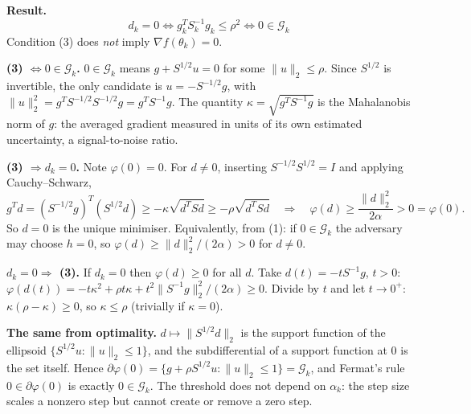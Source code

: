 \documentclass[11pt,a4paper]{article}
\newcommand{\G}{\mathcal{G}_k}
\newcommand{\norm}[1]{\lVert #1\rVert_2}
\begin{document}
\textbf{Result.}
\begin{equation*}
\boxed{\;d_k=0\iff g_k^TS_k^{-1}g_k\le\rho^2\iff0\in\G\;}
\end{equation*}
Condition (3) does \emph{not} imply $\nabla f(\theta_k)=0$.

\textbf{(3) $\iff0\in\G$.} $0\in\G$ means $g+S^{1/2}u=0$ for some $\norm u\le\rho$. Since
$S^{1/2}$ is invertible, the only candidate is $u=-S^{-1/2}g$, with
$\norm u^2=g^TS^{-1/2}S^{-1/2}g=g^TS^{-1}g$. The quantity $\kappa=\sqrt{g^TS^{-1}g}$ is
the Mahalanobis norm of $g$: the averaged gradient measured in units of its own estimated
uncertainty, a signal-to-noise ratio.

\textbf{(3) $\Rightarrow d_k=0$.} Note $\varphi(0)=0$. For $d\ne0$, inserting
$S^{-1/2}S^{1/2}=I$ and applying Cauchy--Schwarz,
\begin{equation*}
g^Td=(S^{-1/2}g)^T(S^{1/2}d)\ge-\kappa\sqrt{d^TSd}\ge-\rho\sqrt{d^TSd}
\quad\Longrightarrow\quad
\varphi(d)\ge\frac{\norm d^2}{2\alpha}>0=\varphi(0).
\end{equation*}
So $d=0$ is the unique minimiser. Equivalently, from (1): if $0\in\G$ the adversary may choose
$h=0$, so $\varphi(d)\ge\norm d^2/(2\alpha)>0$ for $d\ne0$.

\textbf{$d_k=0\Rightarrow$ (3).} If $d_k=0$ then $\varphi(d)\ge0$ for all $d$. Take
$d(t)=-tS^{-1}g$, $t>0$:
$\varphi(d(t))=-t\kappa^2+\rho t\kappa+t^2\norm{S^{-1}g}^2/(2\alpha)\ge0$. Divide by $t$
and let $t\to0^+$: $\kappa(\rho-\kappa)\ge0$, so $\kappa\le\rho$ (trivially if $\kappa=0$).

\textbf{The same from optimality.} $d\mapsto\norm{S^{1/2}d}$ is the support function of the
ellipsoid $\{S^{1/2}u:\norm u\le1\}$, and the subdifferential of a support function at $0$ is
the set itself. Hence $\partial\varphi(0)=\{g+\rho S^{1/2}u:\norm u\le1\}=\G$, and Fermat's
rule $0\in\partial\varphi(0)$ is exactly $0\in\G$. The threshold does not depend on
$\alpha_k$: the step size scales a nonzero step but cannot create or remove a zero step.
\end{document}

